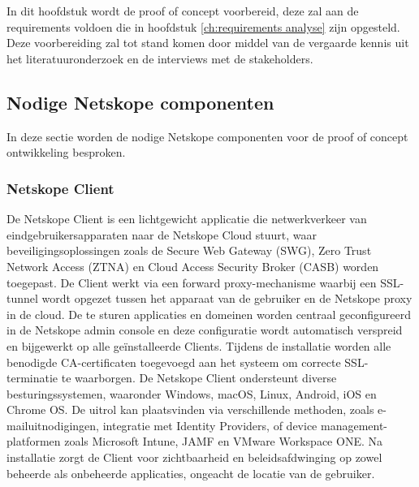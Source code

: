 
\chapter{}%
\label{ch:proof of concept preparation}

In dit hoofdstuk wordt de proof of concept voorbereid, deze zal aan de requirements voldoen die in hoofdstuk \ref{ch:requirements analyse} zijn opgesteld. Deze voorbereiding zal tot stand komen door middel van de vergaarde kennis uit het literatuuronderzoek en de interviews met de stakeholders.

\section{Nodige Netskope componenten}

In deze sectie worden de nodige Netskope componenten voor de proof of concept ontwikkeling besproken.

\subsection{Netskope Client}
De Netskope Client is een lichtgewicht applicatie die netwerkverkeer van eindgebruikersapparaten naar de Netskope Cloud stuurt, waar beveiligingsoplossingen zoals de Secure Web Gateway (SWG), Zero Trust Network Access (ZTNA) en Cloud Access Security Broker (CASB) worden toegepast. De Client werkt via een forward proxy-mechanisme waarbij een SSL-tunnel wordt opgezet tussen het apparaat van de gebruiker en de Netskope proxy in de cloud. De te sturen applicaties en domeinen worden centraal geconfigureerd in de Netskope admin console en deze configuratie wordt automatisch verspreid en bijgewerkt op alle geïnstalleerde Clients. Tijdens de installatie worden alle benodigde CA-certificaten toegevoegd aan het systeem om correcte SSL-terminatie te waarborgen.
De Netskope Client ondersteunt diverse besturingssystemen, waaronder Windows, macOS, Linux, Android, iOS en Chrome OS. De uitrol kan plaatsvinden via verschillende methoden, zoals e-mailuitnodigingen, integratie met Identity Providers, of device management-platformen zoals Microsoft Intune, JAMF en VMware Workspace ONE. Na installatie zorgt de Client voor zichtbaarheid en beleidsafdwinging op zowel beheerde als onbeheerde applicaties, ongeacht de locatie van de gebruiker.~\autocite{Netskope2025-8}

